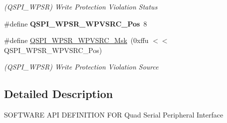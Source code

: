 \begin{DoxyCompactItemize}
\begin{DoxyCompactList}\small\item\em (Q\+S\+P\+I\+\_\+\+W\+P\+SR) Write Protection Violation Status \end{DoxyCompactList}\item 
\mbox{\label{group__SAME70__QSPI_ga3b09542f57db4ff8079f2eb7502fd8ae}} 
\#define {\bfseries Q\+S\+P\+I\+\_\+\+W\+P\+S\+R\+\_\+\+W\+P\+V\+S\+R\+C\+\_\+\+Pos}~8
\item 
\mbox{\label{group__SAME70__QSPI_gab225658731bd850a2bfa6bd12ecb6cea}} 
\#define \mbox{\hyperlink{group__SAME70__QSPI_gab225658731bd850a2bfa6bd12ecb6cea}{Q\+S\+P\+I\+\_\+\+W\+P\+S\+R\+\_\+\+W\+P\+V\+S\+R\+C\+\_\+\+Msk}}~(0xffu $<$$<$ Q\+S\+P\+I\+\_\+\+W\+P\+S\+R\+\_\+\+W\+P\+V\+S\+R\+C\+\_\+\+Pos)
\begin{DoxyCompactList}\small\item\em (Q\+S\+P\+I\+\_\+\+W\+P\+SR) Write Protection Violation Source \end{DoxyCompactList}\end{DoxyCompactItemize}


\subsection{Detailed Description}
S\+O\+F\+T\+W\+A\+RE A\+PI D\+E\+F\+I\+N\+I\+T\+I\+ON F\+OR Quad Serial Peripheral Interface 